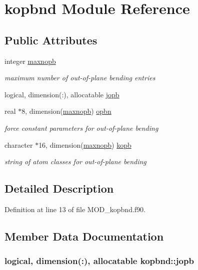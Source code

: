 \hypertarget{classkopbnd}{\section{kopbnd Module Reference}
\label{classkopbnd}
}
\subsection*{Public Attributes}
\begin{DoxyCompactItemize}
\item 
integer \hyperlink{classkopbnd_a2c5e12ca853b2a127a2acee645aab0db}{maxnopb}
\begin{DoxyCompactList}\small\item\em maximum number of out-\/of-\/plane bending entries \end{DoxyCompactList}\item 
logical, dimension(\-:), allocatable \hyperlink{classkopbnd_aaa489ff8b6904d3ed8a7e22c16d1d6ca}{jopb}
\item 
real $\ast$8, dimension(\hyperlink{classkopbnd_a2c5e12ca853b2a127a2acee645aab0db}{maxnopb}) \hyperlink{classkopbnd_aea0acd395ea9eed72b7bda8c1f67a44c}{opbn}
\begin{DoxyCompactList}\small\item\em force constant parameters for out-\/of-\/plane bending \end{DoxyCompactList}\item 
character $\ast$16, dimension(\hyperlink{classkopbnd_a2c5e12ca853b2a127a2acee645aab0db}{maxnopb}) \hyperlink{classkopbnd_aaa7892c0e2e0f5fb23376b5faa9d3218}{kopb}
\begin{DoxyCompactList}\small\item\em string of atom classes for out-\/of-\/plane bending \end{DoxyCompactList}\end{DoxyCompactItemize}


\subsection{Detailed Description}


Definition at line 13 of file M\-O\-D\-\_\-kopbnd.\-f90.



\subsection{Member Data Documentation}
\hypertarget{classkopbnd_aaa489ff8b6904d3ed8a7e22c16d1d6ca}{
\subsubsection[{jopb}]{\setlength{\rightskip}{0pt plus 5cm}logical, dimension(\-:), allocatable kopbnd\-::jopb}}\label{classkopbnd_aaa489ff8b6904d3ed8a7e22c16d1d6ca}



